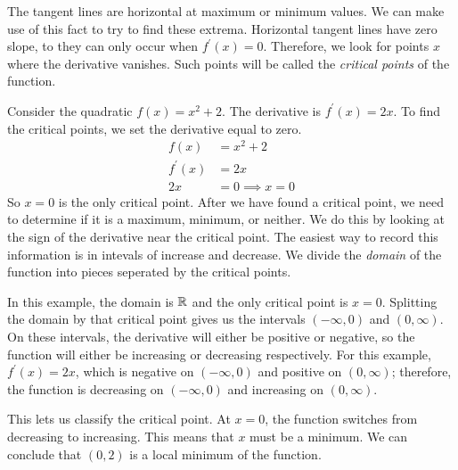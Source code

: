 \documentclass[fleqn]{report}
\begin{document}
The tangent lines are horizontal at maximum or minimum values.
We can make use of this fact to try to find these extrema.
Horizontal tangent lines have zero slope, to they can only
occur when $f^\prime(x) = 0$. Therefore, we look for points
$x$ where the derivative vanishes. Such points will be called
the \emph{critical points} of the function.

\begin{example}
Consider the quadratic $f(x) = x^2 + 2$. The derivative is
$f^\prime(x) = 2x$. To find the critical points, we set the
derivative equal to zero.
\begin{align*}
f(x) & = x^2 + 2 \\
f^\prime(x) & = 2x \\
2x & = 0 \implies x = 0
\end{align*}
So $x=0$ is the only critical point. After we have found a
critical point, we need to determine if it is a maximum,
minimum, or neither. We do this by looking at the sign of the
derivative near the critical point. The easiest way to record
this information is in intevals of increase and decrease. We
divide the \emph{domain} of the function into pieces seperated
by the critical points. 

In this example, the domain is $\mathbb{R}$ and the only critical
point is $x=0$. Splitting the domain by that critical point
gives us the intervals $(-\infty, 0)$ and $(0,\infty)$. On
these intervals, the derivative will either be positive or
negative, so the function will either be increasing or
decreasing respectively. For this example, $f^\prime(x) =
2x$, which is negative on $(-\infty,0)$ and positive on $(0,
\infty)$; therefore, the function is decreasing on
$(-\infty,0)$ and increasing on $(0, \infty)$. 

This lets us classify the critical point. At $x=0$, the
function switches from decreasing to increasing. This means
that $x$ must be a minimum. We can conclude that $(0,2)$ is
a local minimum of the function.
\end{example}
\end{document}
